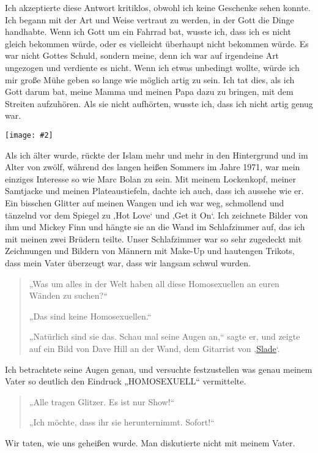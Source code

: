 \documentclass[12pt]{memoir}
\newcommand{\img}[3]{\begin{center}%
\texttt{[image: \#2]}\\{\small\em#3}%
\end{center}}
\begin{document}
Ich akzeptierte diese Antwort kritiklos,
obwohl ich keine Geschenke sehen konnte.
Ich begann mit der Art und Weise vertraut zu werden,
in der Gott die Dinge handhabte.
Wenn ich Gott um ein Fahrrad bat, wusste ich,
dass ich es nicht gleich bekommen würde,
oder es vielleicht überhaupt nicht bekommen würde.
Es war nicht Gottes Schuld, sondern meine,
denn ich war auf irgendeine Art ungezogen und verdiente es nicht.
Wenn ich etwas unbedingt wollte,
würde ich mir große Mühe geben so lange wie möglich artig zu sein.
Ich tat dies, als ich Gott darum bat,
meine Mamma und meinen Papa dazu zu bringen,
mit dem Streiten aufzuhören.
Als sie nicht aufhörten, wusste ich, dass ich nicht artig genug war.

\img{scale=1}{Hassan_Boy.jpg}{}

Als ich älter wurde, rückte der Islam mehr und mehr in den Hintergrund
und im Alter von zwölf, während des langen heißen Sommers im Jahre 1971,
war mein einziges Interesse so wie Marc Bolan zu sein.
Mit meinem Lockenkopf, meiner Samtjacke und meinen Plateaustiefeln,
dachte ich auch, dass ich aussehe wie er.
Ein bisschen Glitter auf meinen Wangen und ich war weg,
schmollend und tänzelnd vor dem Spiegel zu ‚Hot Love‘ und ‚Get it On‘.
Ich zeichnete Bilder von ihm und Mickey Finn und hängte sie an die Wand
im Schlafzimmer auf, das ich mit meinen zwei Brüdern teilte.
Unser Schlafzimmer war so sehr zugedeckt mit Zeichnungen
und Bildern von Männern mit Make-Up und hautengen Trikots,
dass mein Vater überzeugt war, dass wir langsam schwul wurden.

\begin{quote}
„Was um alles in der Welt haben all diese Homosexuellen
an euren Wänden zu suchen?“

„Das sind keine Homosexuellen.“

„Natürlich sind sie das. Schau mal seine Augen an,“ sagte er,
und zeigte auf ein Bild von Dave Hill an der Wand,
dem Gitarrist von ‚\href{http://de.wikipedia.org/wiki/Slade}{Slade}‘.
\end{quote}

Ich betrachtete seine Augen genau, und versuchte festzustellen
was genau meinem Vater so deutlich den Eindruck „HOMOSEXUELL“ vermittelte.

\begin{quote}
„Alle tragen Glitzer. Es ist nur Show!“

„Ich möchte, dass ihr sie herunternimmt. Sofort!“
\end{quote}

Wir taten, wie uns geheißen wurde. Man diskutierte nicht mit meinem Vater.
\end{document}
